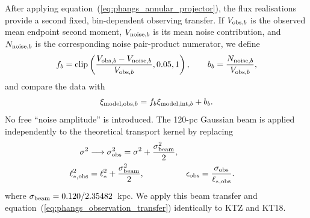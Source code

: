 \documentclass[fleqn,usenatbib]{mnras}
\begin{document}
After applying equation~(\ref{eq:phangs_annular_projector}), the flux realisations provide a second fixed, bin-dependent observing transfer.  If $V_{{\rm obs},b}$ is the observed mean endpoint second moment, $V_{{\rm noise},b}$ is its mean noise contribution, and $N_{{\rm noise},b}$ is the corresponding noise pair-product numerator, we define
\begin{equation}
    f_b=\operatorname{clip}\left(
    \frac{V_{{\rm obs},b}-V_{{\rm noise},b}}{V_{{\rm obs},b}},
    0.05,1\right),
    \qquad
    b_b=\frac{N_{{\rm noise},b}}{V_{{\rm obs},b}},
\end{equation}
and compare the data with
\begin{equation}
    \xi_{{\rm model,obs},b}=f_b\xi_{{\rm model,int},b}+b_b.
    \label{eq:phangs_observation_transfer}
\end{equation}
No free ``noise amplitude'' is introduced.  The 120-pc Gaussian beam is applied independently to the theoretical transport kernel by replacing
\begin{equation}
    \begin{aligned}
    \sigma^2&\longrightarrow\sigma_{\rm obs}^2
    =\sigma^2+\frac{\sigma_{\rm beam}^2}{2},\\
    \ell_{\ast,\rm obs}^2&=\ell_\ast^2
    +\frac{\sigma_{\rm beam}^2}{2},
    &\epsilon_{\rm obs}&=\frac{\sigma_{\rm obs}}{\ell_{\ast,\rm obs}}.
    \end{aligned}
    \label{eq:phangs_beam_transfer}
\end{equation}
where $\sigma_{\rm beam}=0.120/2.35482$~kpc.  We apply this beam transfer and equation~(\ref{eq:phangs_observation_transfer}) identically to KTZ and KT18.
\end{document}
